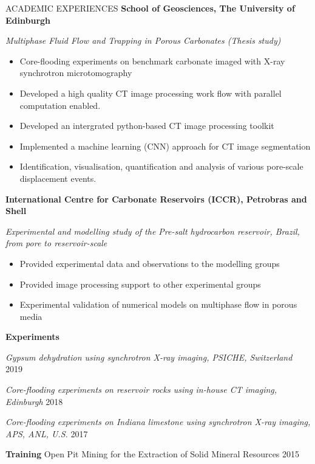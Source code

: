 \documentclass{resume} %
\newenvironment{indentpar}[1]%
  {\begin{list}{}%
          {\setlength{\leftmargin}{#1}}%
          \item[]%
  }
  {\end{list}}
\begin{document}
\begin{rSection}{ACADEMIC EXPERIENCES}
\textbf{School of Geosciences, The University of Edinburgh} 
\begin{indentpar}{0.5cm}
\textit{Multiphase Fluid Flow and Trapping in Porous Carbonates (Thesis study)}
\begin{itemize}
    \item Core-flooding experiments on benchmark carbonate imaged with X-ray synchrotron microtomography
    \item Developed a high quality CT image processing work flow with parallel computation enabled.
    \item Developed an intergrated python-based CT image processing toolkit 
    \item Implemented a machine learning (CNN) approach for CT image segmentation
    \item Identification, visualisation, quantification and analysis of various pore-scale displacement events.
\end{itemize}
\end{indentpar}

\textbf{International Centre for Carbonate Reservoirs (ICCR), Petrobras and Shell} 
\begin{indentpar}{0.5cm}
\textit{Experimental and modelling study of the Pre-salt hydrocarbon reservoir, Brazil, from pore to reservoir-scale}
\begin{itemize}
    \item Provided experimental data and observations to the modelling groups 
    \item Provided image processing support to other experimental groups
    \item Experimental validation of numerical models on multiphase flow in porous media
\end{itemize}
\end{indentpar}

\textbf{Experiments} 
\begin{indentpar}{0.5cm}
\textit{Gypsum dehydration using synchrotron X-ray imaging, PSICHE, Switzerland} \hfill {2019}

\textit{Core-flooding experiments on reservoir rocks using in-house CT imaging, Edinburgh} \hfill {2018}

\textit{Core-flooding experiments on Indiana limestone using synchrotron X-ray imaging, APS, ANL, U.S.} \hfill {2017}
\end{indentpar}

\textbf{Training} Open Pit Mining for the Extraction of Solid Mineral Resources \hfill {2015}

\end{rSection}
\end{document}
